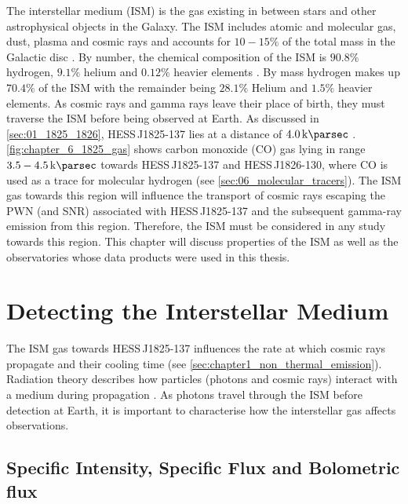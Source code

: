 The interstellar medium (ISM) is the gas existing in between stars and other astrophysical objects in the Galaxy. The ISM includes atomic and molecular gas, dust, plasma and cosmic rays and accounts for $10-15\%$ of the total mass in the Galactic disc \citep{2001RvMP...73.1031F}. By number, the chemical composition of the ISM is $90.8\%$ hydrogen, $9.1\%$ helium and $0.12\%$ heavier elements \citep{2001RvMP...73.1031F}. By mass hydrogen makes up $70.4\%$ of the ISM with the remainder being $28.1\%$ Helium and $1.5\%$ heavier elements. As cosmic rays and gamma rays leave their place of birth, they must traverse the ISM before being observed at Earth.
\newpar 
As discussed in \autoref{sec:01_1825_1826}, \mbox{HESS\,J1825-137} lies at a distance of $4.0\,\kpc$  \citep{2006A&A...460..365A}. \autoref{fig:chapter_6_1825_gas} shows carbon monoxide (CO) gas lying in range $3.5-4.5\,\kpc$ towards \mbox{HESS\,J1825-137} and \mbox{HESS\,J1826-130}, where CO is used as a trace for molecular hydrogen (see \autoref{sec:06_molecular_tracers}). The ISM gas towards this region will influence the transport of cosmic rays escaping the PWN (and SNR) associated with \mbox{HESS\,J1825-137} and the subsequent gamma-ray emission from this region. Therefore, the ISM must be considered in any study towards this region. This chapter will discuss properties of the ISM as well as the observatories whose data products were used in this thesis.
\newpage  %
\section{Detecting the Interstellar Medium}

The ISM gas towards \mbox{HESS\,J1825-137} influences the rate at which cosmic rays propagate and their cooling time (see \autoref{sec:chapter1_non_thermal_emission}). Radiation theory describes how particles (photons and cosmic rays) interact with a medium during propagation \citep{2011piim.book.....D}. As photons travel through the ISM before detection at Earth, it is important to characterise how the interstellar gas affects observations.

\subsection{Specific Intensity, Specific Flux and Bolometric flux}

